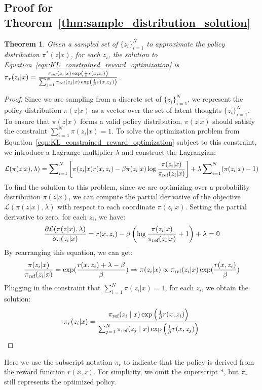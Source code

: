 \documentclass{article} %
\newtheorem{theorem}{Theorem}
\begin{document}
\subsection{Proof for Theorem~\ref{thm:sample_distribution_solution}}\label{appendix:sample_distribution_solution_proof}
\begin{theorem}\label{thm:sample_distribution_solution_appendix}
    Given a sampled set of $\{z_i\}^{N}_{i=1}$ to approximate the policy distribution $\pi^{*}(z|x)$, for each $z_i$, the solution to Equation~\ref{eqn:KL_constrained_reward_optimization} is 
    $\pi_{r}(z_i|x)=\frac{\pi_\text{ref}(z_i\mid x)\exp\left(\frac{1}{\beta}r(x, z_i)\right)}{\sum^{N}_{j=1}\pi_\text{ref}(z_j\mid x)\exp\left(\frac{1}{\beta}r(x, z_j)\right)}$.
\end{theorem}
\begin{proof}
Since we are sampling from a discrete set of $\{z_i\}^{N}_{i=1}$, we represent the policy distribution $\pi(z|x)$ as a vector over the set of latent thoughts $\{z_i\}^{N}_{i=1}$. To ensure that $\pi(z|x)$ forms a valid policy distribution, $\pi(z|x)$ should satisfy the constraint $\sum^{N}_{i=1}\pi(z_i|x)=1$. To solve the optimization problem from Equation~\ref{eqn:KL_constrained_reward_optimization} subject to this constraint, we introduce a Lagrange multiplier $\lambda$ and construct the Lagrangian:
\begin{equation*}
\mathcal{L}(\pi(z|x),\lambda)=\sum\nolimits^{N}_{i=1}\left[\pi(z_i|x)r(x,z_i)-\beta\pi(z_i|x)\log{\frac{\pi(z_i|x)}{\pi_\text{ref}(z_i|x)}}\right]+\lambda\sum\nolimits^{N}_{i=1}(\pi(z_i|x)-1) 
\end{equation*}
To find the solution to this problem, since we are optimizing over a probability distribution $\pi(z|x)$, we can compute the partial derivative of the objective $\mathcal{L}(\pi(z|x),\lambda)$ with respect to each coordinate $\pi(z_i|x)$. Setting the partial derivative to zero, for each $z_i$, we have:
\begin{equation*}
    \frac{\partial \mathcal{L}(\pi(z|x),\lambda)}{\partial\pi(z_i|x)}=r(x,z_i)-\beta\left(\log{\frac{\pi(z_i|x)}{\pi_\text{ref}(z_i|x)}+1}\right)+\lambda=0
\end{equation*}
By rearranging this equation, we can get:
\begin{equation*}
    \frac{\pi(z_i|x)}{\pi_\text{ref}(z_i|x)}=\exp(\frac{r(x,z_i)+\lambda-\beta}{\beta})\Rightarrow\pi(z_i|x)\propto\pi_\text{ref}(z_i|x)\exp(\frac{r(x,z_i)}{\beta})
\end{equation*}
Plugging in the constraint that $\sum^{N}_{i=1}\pi(z_i|x)=1$, for each $z_i$, we obtain the solution:
\begin{equation*}
\pi_{r}(z_i|x)=\frac{\pi_\text{ref}(z_i\mid x)\exp\left(\frac{1}{\beta}r(x, z_i)\right)}{\sum^{N}_{j=1}\pi_\text{ref}(z_j\mid x)\exp\left(\frac{1}{\beta}r(x, z_j)\right)}
\end{equation*}
\end{proof}
Here we use the subscript notation $\pi_{r}$ to indicate that the policy is derived from the reward function $r(x, z)$. For simplicity, we omit the superscript $*$, but $\pi_{r}$ still represents the optimized policy. 
\end{document}
